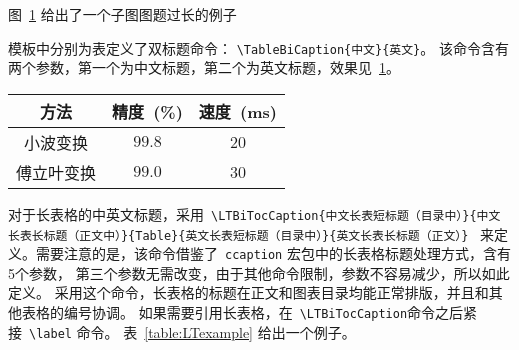 图~\ref{Figure:Tricks:Example31} 给出了一个子图图题过长的例子
\begin{figure}[htbp]
\centering
\begin{minipage}[t]{0.20\textwidth}
\centering
{}
\end{minipage}\hspace{2em}
\begin{minipage}[t]{0.20\textwidth}
\centering
{}
\end{minipage}\hspace{2em}
\begin{minipage}[t]{0.20\textwidth}
\centering
{}
\end{minipage}
\label{Figure:Tricks:Example31}
\end{figure}


模板中分别为表定义了双标题命令：
\verb"\TableBiCaption{中文}{英文}"。
该命令含有两个参数，第一个为中文标题，第二个为英文标题，效果见~\ref{Tricks:Tab1}。


\begin{table}[htbp]
\centering \wuhao %
\label{Tricks:Tab1}
\begin{tabular}{c|c|c}
  \hline
  方法 & 精度~(\%) & 速度~(ms) \\
  \hline
  小波变换 & $99.8$ &  20\\
  傅立叶变换 & $99.0$ & 30 \\
  \hline
\end{tabular}
\end{table}

对于长表格的中英文标题，采用~\verb"\LTBiTocCaption{中文长表短标题（目录中）}{中文长表长标题（正文中）}{Table}{英文长表短标题（目录中）}{英文长表长标题（正文）}"
~来定义。需要注意的是，该命令借鉴了~\verb|ccaption| 宏包中的长表格标题处理方式，含有5个参数，
第三个参数无需改变，由于其他命令限制，参数不容易减少，所以如此定义。
采用这个命令，长表格的标题在正文和图表目录均能正常排版，并且和其他表格的编号协调。
如果需要引用长表格，在~\verb|\LTBiTocCaption|命令之后紧接~\verb|\label| 命令。
表~\ref{table:LTexample} 给出一个例子。

